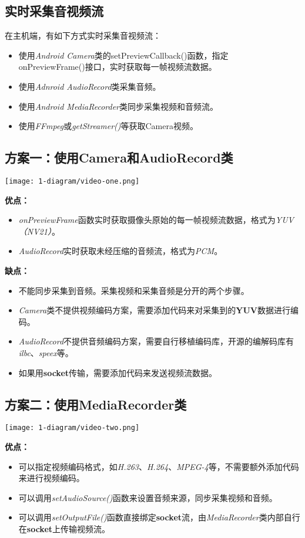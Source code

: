 \documentclass[11pt,a4paper]{article}
\begin{document}
\begin{CJK}{UTF8}{gbsn}
    \section{实时采集音视频流}
    在主机端，有如下方式实时采集音视频流：
    \begin{itemize}
        \item 使用\emph{Android Camera}类的setPreviewCallback()函数，指定\\
            onPreviewFrame()接口，实时获取每一帧视频流数据。
        \item 使用\emph{Adnroid AudioRecord}类采集音频。
        \item 使用\emph{Android MediaRecorder}类同步采集视频和音频流。
        \item 使用\emph{FFmpeg}或\emph{getStreamer()}等获取Camera视频。
    \end{itemize}

    \subsection{方案一：使用Camera和AudioRecord类}
    \texttt{[image: 1-diagram/video-one.png]}
    \par
    \textbf{优点：}
    \begin{itemize}
        \item \emph{onPreviewFrame}函数实时获取摄像头原始的每一帧视频流数据，格式为\emph{YUV（NV21）}。
        \item \emph{AudioRecord}实时获取未经压缩的音频流，格式为\emph{PCM}。
    \end{itemize}

    \textbf{缺点：}
    \begin{itemize}
        \item 不能同步采集到音频。采集视频和采集音频是分开的两个步骤。
        \item \emph{Camera}类不提供视频编码方案，需要添加代码来对采集到的\textbf{YUV}数据进行编码。
        \item \emph{AudioRecord}不提供音频编码方案，需要自行移植编码库，开源的编解码库有\emph{ilbc}、\emph{speex}等。
        \item 如果用\textbf{socket}传输，需要添加代码来发送视频流数据。
    \end{itemize}

    \subsection{方案二：使用MediaRecorder类}
    \texttt{[image: 1-diagram/video-two.png]}
    \par
    \textbf{优点：}
    \begin{itemize}
        \item 可以指定视频编码格式，如\emph{H.263}、\emph{H.264}、\emph{MPEG-4}等，不需要额外添加代码来进行视频编码。
        \item 可以调用\emph{setAudioSource()}函数来设置音频来源，同步采集视频和音频。
        \item 可以调用\emph{setOutputFile()}函数直接绑定\textbf{socket}流，由\emph{MediaRecorder}类内部自行在\textbf{socket}上传输视频流。
    \end{itemize}


\end{CJK}
\end{document}
